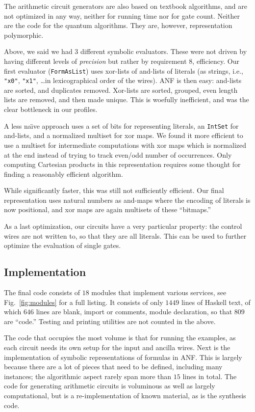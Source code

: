\documentclass[sigplan,screen]{acmart}
\theoremstyle{definition}
\begin{document}
The arithmetic circuit generators are also based on textbook algorithms, and are
not optimized in any way, neither for running time nor for gate count. Neither are
the code for the quantum algorithms. They are, however, representation
polymorphic.

Above, we said we had $3$ different symbolic evaluators. These were not driven
by having different levels of \emph{precision} but rather by requirement $8$,
efficiency. Our first evaluator (\texttt{FormAsList}) uses xor-lists of
and-lists of literals (as strings, i.e.,
\texttt{"x0"}, \texttt{"x1"}, \ldots in lexicographical order of the wires). ANF
is then easy: and-lists are sorted, and duplicates removed. Xor-lists are sorted,
grouped, even length lists are removed, and then made unique. This is woefully
inefficient, and was the clear bottleneck in our profiles.

A less na\"{\i}ve approach uses a set of bits for representing literals, an
\texttt{IntSet} for and-lists, and a normalized multiset for xor maps. We found
it more efficient to use a multiset for intermediate computations with xor maps
which is normalized at the end instead of trying to track even/odd number of
occurrences. Only computing Cartesian products in this representation requires
some thought for finding a reasonably efficient algorithm.

While significantly faster, this was still not sufficiently efficient. Our final
representation uses natural numbers as and-maps where the encoding of literals is
now positional, and xor maps are again multisets of these ``bitmaps.''

As a last optimization, our circuits have a very particular property: the control
wires are not written to, so that they are all literals. This can be used to
further optimize the evaluation of single gates.

\subsection{Implementation}

The final code consists of $18$ modules that implement various
services, see Fig.~\ref{fig:modules} for a full listing. It consists of
only $1449$ lines of Haskell text, of which $646$ lines are blank, import or
comments, module declaration, so that $809$ are ``code.'' Testing and printing
utilities are not counted in the above.

The code that occupies the most volume is that for running the examples, as each
circuit needs its own setup for the input and ancilla wires. Next is the implementation
of symbolic representations of formulas in ANF. This is largely because there are a
lot of pieces that need to be defined, including many instances; the algorithmic aspect
rarely span more than $15$ lines in total. The code for generating arithmetic circuits
is voluminous as well as largely computational, but is a re-implementation of known
material, as is the synthesis code.
\end{document}
